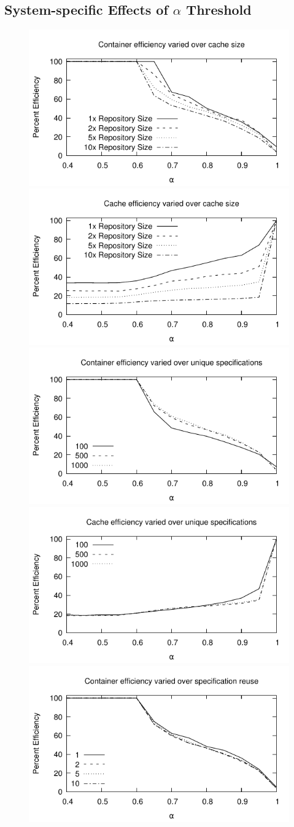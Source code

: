 \documentclass[sigconf]{acmart}
\begin{document}
\subsection{System-specific Effects of $\alpha$ Threshold}

\begin{figure}
\includegraphics[width=0.48\linewidth]{curated/sensitivity/container_efficiency_cache.pdf}
\hfill
\includegraphics[width=0.48\linewidth]{curated/sensitivity/cache_efficiency_cache.pdf}
\includegraphics[width=0.48\linewidth]{curated/sensitivity/container_efficiency_request.pdf}
\hfill
\includegraphics[width=0.48\linewidth]{curated/sensitivity/cache_efficiency_request.pdf}
\includegraphics[width=0.48\linewidth]{curated/sensitivity/container_efficiency_uses.pdf}

\end{figure}
\end{document}
